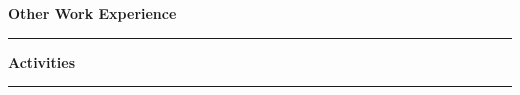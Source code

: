 \documentclass{article}
\begin{document}
\noindent\large{\textbf{Other Work Experience}}\\[-0.6em]
\noindent\rule{\textwidth}{0.4pt}
\begin{normalsize}
    
\end{normalsize}
\vspace{0.7em}


\noindent\large{\textbf{Activities}}\\[-0.6em]
\noindent\rule{\textwidth}{0.4pt}
\begin{normalsize}
    
\end{normalsize}
\vspace{0.7em}
\end{document}
